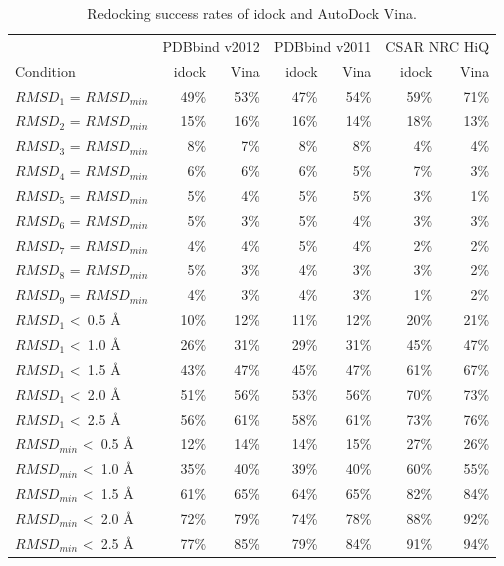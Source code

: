 \begin{table}
\caption{Redocking success rates of idock and AutoDock Vina.}
\label{istar:RedockingSuccessRate} 
\begin{tabular}{lrrrrrr}
\hline
& \multicolumn{2}{c}{PDBbind v2012} & \multicolumn{2}{c}{PDBbind v2011} & \multicolumn{2}{c}{CSAR NRC HiQ}\\
Condition & idock & Vina & idock & Vina & idock & Vina\\
\hline
$RMSD_1$ = $RMSD_{min}$         & 49\% & 53\% & 47\% & 54\% & 59\% & 71\%\\
$RMSD_2$ = $RMSD_{min}$         & 15\% & 16\% & 16\% & 14\% & 18\% & 13\%\\
$RMSD_3$ = $RMSD_{min}$         &  8\% &  7\% &  8\% &  8\% &  4\% &  4\%\\
$RMSD_4$ = $RMSD_{min}$         &  6\% &  6\% &  6\% &  5\% &  7\% &  3\%\\
$RMSD_5$ = $RMSD_{min}$         &  5\% &  4\% &  5\% &  5\% &  3\% &  1\%\\
$RMSD_6$ = $RMSD_{min}$         &  5\% &  3\% &  5\% &  4\% &  3\% &  3\%\\
$RMSD_7$ = $RMSD_{min}$         &  4\% &  4\% &  5\% &  4\% &  2\% &  2\%\\
$RMSD_8$ = $RMSD_{min}$         &  5\% &  3\% &  4\% &  3\% &  3\% &  2\%\\
$RMSD_9$ = $RMSD_{min}$         &  4\% &  3\% &  4\% &  3\% &  1\% &  2\%\\
\noalign{\smallskip}
$RMSD_1$     \textless\ 0.5 \AA & 10\% & 12\% & 11\% & 12\% & 20\% & 21\%\\
$RMSD_1$     \textless\ 1.0 \AA & 26\% & 31\% & 29\% & 31\% & 45\% & 47\%\\
$RMSD_1$     \textless\ 1.5 \AA & 43\% & 47\% & 45\% & 47\% & 61\% & 67\%\\
$RMSD_1$     \textless\ 2.0 \AA & 51\% & 56\% & 53\% & 56\% & 70\% & 73\%\\
$RMSD_1$     \textless\ 2.5 \AA & 56\% & 61\% & 58\% & 61\% & 73\% & 76\%\\
\noalign{\smallskip}
$RMSD_{min}$ \textless\ 0.5 \AA & 12\% & 14\% & 14\% & 15\% & 27\% & 26\%\\
$RMSD_{min}$ \textless\ 1.0 \AA & 35\% & 40\% & 39\% & 40\% & 60\% & 55\%\\
$RMSD_{min}$ \textless\ 1.5 \AA & 61\% & 65\% & 64\% & 65\% & 82\% & 84\%\\
$RMSD_{min}$ \textless\ 2.0 \AA & 72\% & 79\% & 74\% & 78\% & 88\% & 92\%\\
$RMSD_{min}$ \textless\ 2.5 \AA & 77\% & 85\% & 79\% & 84\% & 91\% & 94\%\\
\hline
\end{tabular}
\end{table}

